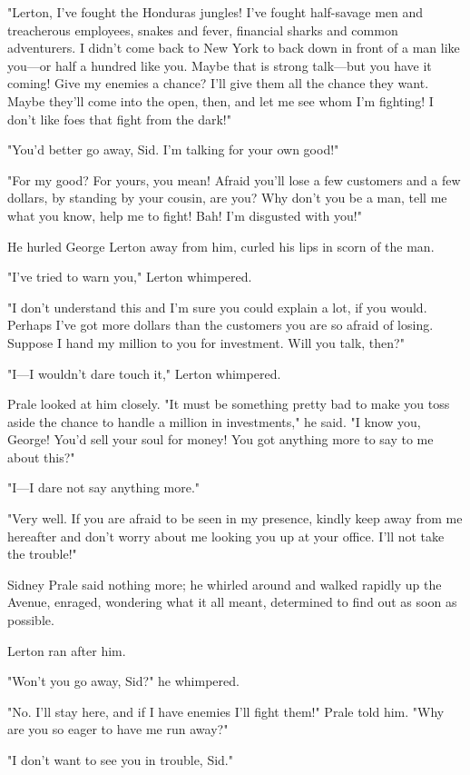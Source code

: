 \documentclass{novel}
\begin{document}
"Lerton, I've fought the Honduras jungles! I've fought half-savage men and treacherous employees, snakes and fever, financial sharks and common adventurers. I didn't come back to New York to back down in front of a man like you---or half a hundred like you. Maybe that is strong talk---but you have it coming! Give my enemies a chance? I'll give them all the chance they want. Maybe they'll come into the open, then, and let me see whom I'm fighting! I don't like foes that fight from the dark!"

"You'd better go away, Sid. I'm talking for your own good!"

"For my good? For yours, you mean! Afraid you'll lose a few customers and a few dollars, by standing by your cousin, are you? Why don't you be a man, tell me what you know, help me to fight! Bah! I'm disgusted with you!"

He hurled George Lerton away from him, curled his lips in scorn of the man.

"I've tried to warn you," Lerton whimpered.

"I don't understand this and I'm sure you could explain a lot, if you would. Perhaps I've got more dollars than the customers you are so afraid of losing. Suppose I hand my million to you for investment. Will you talk, then?"

"I---I wouldn't dare touch it," Lerton whimpered.

Prale looked at him closely. "It must be something pretty bad to make you toss aside the chance to handle a million in investments," he said. "I know you, George! You'd sell your soul for money! You got anything more to say to me about this?"

"I---I dare not say anything more."

"Very well. If you are afraid to be seen in my presence, kindly keep away from me hereafter and don't worry about me looking you up at your office. I'll not take the trouble!"

Sidney Prale said nothing more; he whirled around and walked rapidly up the Avenue, enraged, wondering what it all meant, determined to find out as soon as possible.

Lerton ran after him.

"Won't you go away, Sid?" he whimpered.

"No. I'll stay here, and if I have enemies I'll fight them!" Prale told him. "Why are you so eager to have me run away?"

"I don't want to see you in trouble, Sid."
\end{document}
